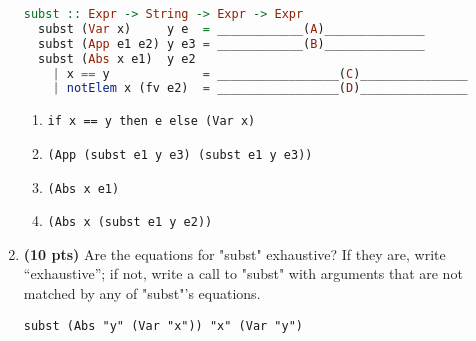 \documentclass[paper=letter, fontsize=13pt]{article} %
\numberwithin{equation}{section} %
\newif\ifshowanswers\showanswerstrue
\begin{document}
\begin{enumerate}
\begin{lstlisting}[language=Haskell]
  subst :: Expr -> String -> Expr -> Expr
  subst (Var x)     y e  = ____________(A)______________
  subst (App e1 e2) y e3 = ____________(B)______________
  subst (Abs x e1)  y e2 
    | x == y             = _________________(C)_______________
    | notElem x (fv e2)  = _________________(D)_______________ 
\end{lstlisting}
\vspace{-12em}
\begin{enumerate}[label=(\Alph*)]
   \item 
     \ifshowanswers 
      \verb|if x == y then e else (Var x)| 
     \else
           \bigskip
           \bigskip
           \bigskip
           \bigskip
           \bigskip
           \bigskip
           \bigskip
           \bigskip
           \bigskip
           \bigskip
           \bigskip
           \bigskip
     \fi
   \item 
     \ifshowanswers 
      \verb|(App (subst e1 y e3) (subst e1 y e3))|
     \else
           \bigskip
           \bigskip
           \bigskip
           \bigskip
           \bigskip
           \bigskip
           \bigskip
           \bigskip
           \bigskip
           \bigskip
           \bigskip
           \bigskip
     \fi
     \newpage
   \item 
     \ifshowanswers 
      \verb|(Abs x e1)|
     \else
           \bigskip
           \bigskip
           \bigskip
           \bigskip
           \bigskip
           \bigskip
           \bigskip
           \bigskip
           \bigskip
           \bigskip
           \bigskip
           \bigskip
     \fi
   \item 
     \ifshowanswers 
      \verb|(Abs x (subst e1 y e2))|
     \else
           \bigskip
           \bigskip
           \bigskip
           \bigskip
           \bigskip
           \bigskip
           \bigskip
           \bigskip
           \bigskip
           \bigskip
           \bigskip
           \bigskip
     \fi
\end{enumerate}
\vspace{12em}

\item \textbf{(10 pts)} Are the equations for "subst" exhaustive? If they are, write ``exhaustive''; if not, write a call to "subst"  with arguments that are not matched by any of "subst"'s equations.
     \ifshowanswers 
      \verb|subst (Abs "y" (Var "x")) "x" (Var "y")|
     \else
           \bigskip
           \bigskip
           \bigskip
           \bigskip
           \bigskip
           \bigskip
     \fi
\end{enumerate}
\newpage
\[ \]
\newpage
\end{document}

